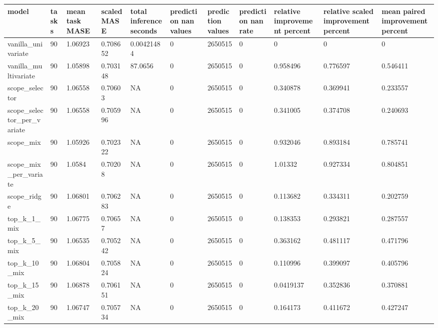 \begin{tabular}{lllllllllll}
\toprule
model & tasks & mean task MASE & scaled MASE & total inference seconds & prediction nan values & prediction values & prediction nan rate & relative improvement percent & relative scaled improvement percent & mean paired improvement percent \\
\midrule
vanilla\_univariate & 90 & 1.06923 & 0.708652 & 0.00421484 & 0 & 2650515 & 0 & 0 & 0 & 0 \\
vanilla\_multivariate & 90 & 1.05898 & 0.703148 & 87.0656 & 0 & 2650515 & 0 & 0.958496 & 0.776597 & 0.546411 \\
scope\_selector & 90 & 1.06558 & 0.70603 & NA & 0 & 2650515 & 0 & 0.340878 & 0.369941 & 0.233557 \\
scope\_selector\_per\_variate & 90 & 1.06558 & 0.705996 & NA & 0 & 2650515 & 0 & 0.341005 & 0.374708 & 0.240693 \\
scope\_mix & 90 & 1.05926 & 0.702322 & NA & 0 & 2650515 & 0 & 0.932046 & 0.893184 & 0.785741 \\
scope\_mix\_per\_variate & 90 & 1.0584 & 0.70208 & NA & 0 & 2650515 & 0 & 1.01332 & 0.927334 & 0.804851 \\
scope\_ridge & 90 & 1.06801 & 0.706283 & NA & 0 & 2650515 & 0 & 0.113682 & 0.334311 & 0.202759 \\
top\_k\_1\_mix & 90 & 1.06775 & 0.70657 & NA & 0 & 2650515 & 0 & 0.138353 & 0.293821 & 0.287557 \\
top\_k\_5\_mix & 90 & 1.06535 & 0.705242 & NA & 0 & 2650515 & 0 & 0.363162 & 0.481117 & 0.471796 \\
top\_k\_10\_mix & 90 & 1.06804 & 0.705824 & NA & 0 & 2650515 & 0 & 0.110996 & 0.399097 & 0.405796 \\
top\_k\_15\_mix & 90 & 1.06878 & 0.706151 & NA & 0 & 2650515 & 0 & 0.0419137 & 0.352836 & 0.370881 \\
top\_k\_20\_mix & 90 & 1.06747 & 0.705734 & NA & 0 & 2650515 & 0 & 0.164173 & 0.411672 & 0.427247 \\
\bottomrule
\end{tabular}
